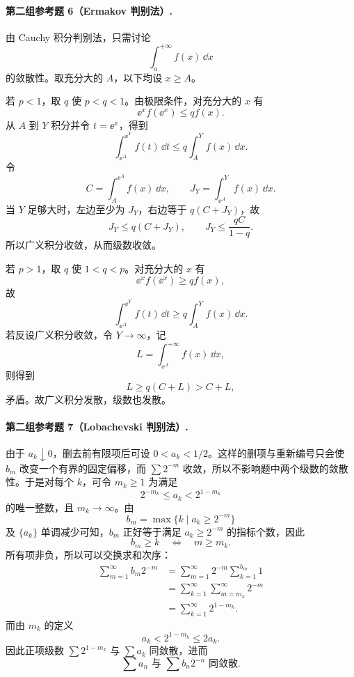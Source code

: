 \paragraph{第二组参考题 6（Ermakov 判别法）.}
\begin{xsolution}
由 Cauchy 积分判别法，只需讨论
\[
 \int_a^{+\infty}f(x)\,\dd x
\]
的敛散性。取充分大的 $A$，以下均设 $x\geq A$。

若 $p<1$，取 $q$ 使 $p<q<1$。由极限条件，对充分大的 $x$ 有
\[
 \ee^xf(\ee^x)\leq qf(x).
\]
从 $A$ 到 $Y$ 积分并令 $t=\ee^x$，得到
\[
 \int_{\ee^A}^{\ee^Y}f(t)\,\dd t
 \leq q\int_A^Y f(x)\,\dd x.
\]
令
\[
 C=\int_A^{\ee^A}f(x)\,\dd x,
 \qquad
 J_Y=\int_{\ee^A}^{Y}f(x)\,\dd x.
\]
当 $Y$ 足够大时，左边至少为 $J_Y$，右边等于 $q(C+J_Y)$，故
\[
 J_Y\leq q(C+J_Y),
 \qquad
 J_Y\leq\frac{qC}{1-q}.
\]
所以广义积分收敛，从而级数收敛。

若 $p>1$，取 $q$ 使 $1<q<p$。对充分大的 $x$ 有
\[
 \ee^xf(\ee^x)\geq qf(x),
\]
故
\[
 \int_{\ee^A}^{\ee^Y}f(t)\,\dd t
 \geq q\int_A^Y f(x)\,\dd x.
\]
若反设广义积分收敛，令 $Y\to\infty$，记
\[
 L=\int_{\ee^A}^{+\infty}f(x)\,\dd x,
\]
则得到
\[
 L\geq q(C+L)>C+L,
\]
矛盾。故广义积分发散，级数也发散。
\end{xsolution}

\paragraph{第二组参考题 7（Lobachevski 判别法）.}
\begin{xsolution}
由于 $a_k\downarrow0$，删去前有限项后可设 $0<a_k<1/2$。这样的删项与重新编号只会使 $b_m$ 改变一个有界的固定偏移，而 $\sum2^{-m}$ 收敛，所以不影响题中两个级数的敛散性。于是对每个 $k$，可令 $m_k\geq1$ 为满足
\[
 2^{-m_k}\leq a_k<2^{1-m_k}
\]
的唯一整数，且 $m_k\to\infty$。由
\[
 b_m=\max\{k\mid a_k\geq2^{-m}\}
\]
及 $\{a_k\}$ 单调减少可知，$b_m$ 正好等于满足 $a_k\geq2^{-m}$ 的指标个数，因此
\[
 b_m\geq k\quad\Longleftrightarrow\quad m\geq m_k.
\]
所有项非负，所以可以交换求和次序：
\[
 \begin{aligned}
 \sum_{m=1}^{\infty}b_m2^{-m}
 &=\sum_{m=1}^{\infty}2^{-m}\sum_{k=1}^{b_m}1\\
 &=\sum_{k=1}^{\infty}\sum_{m=m_k}^{\infty}2^{-m}\\
 &=\sum_{k=1}^{\infty}2^{1-m_k}.
 \end{aligned}
\]
而由 $m_k$ 的定义
\[
 a_k<2^{1-m_k}\leq2a_k.
\]
因此正项级数 $\sum2^{1-m_k}$ 与 $\sum a_k$ 同敛散，进而
\[
 \boxed{\sum a_n\text{ 与 }\sum b_n2^{-n}\text{ 同敛散}.}
\]
\end{xsolution}

